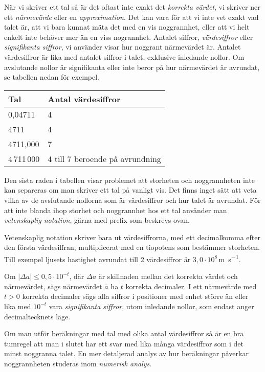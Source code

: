 När vi skriver ett tal så är det oftast inte exakt det \emph{korrekta
värdet}, vi skriver ner ett \emph{närmevärde} eller en
\emph{approximation}.  Det kan vara för att vi inte vet exakt vad
talet är, att vi bara kunnat mäta det med en vis noggrannhet, eller
att vi helt enkelt inte behöver mer än en viss nogrannhet. Antalet
siffror, \emph{värdesiffror} eller \emph{signifikanta siffror}, vi
använder visar hur noggrant närmevärdet är.  Antalet värdesiffror är
lika med antalet siffror i talet, exklusive inledande nollor.  Om
avslutande nollor är signifikanta eller inte beror på hur närmevärdet
är avrundat, se tabellen nedan för exempel.

\bigskip
\begin{centering}
\begin{tabular}{|l|l|}
\hline
Tal & Antal värdesiffror \\
\hline
0,04711 & 4\\
4711 & 4 \\
4711,000 & 7 \\
4\,711\,000 & 4 till 7 beroende på avrundning \\
\hline
\end{tabular}
\end{centering}
\bigskip

Den sista raden i tabellen visar problemet att storheten och
noggrannheten inte kan separeras om man skriver ett tal på vanligt
vis. Det finns inget sätt att veta vilka av de avslutande nollorna som
är värdesiffror och hur talet är avrundat.  För att inte blanda ihop
storhet och noggrannhet hos ett tal använder man \emph{vetenskaplig
notation}, gärna med prefix som beskrevs ovan.

Vetenskaplig notation skriver bara ut värdesiffrorna, med ett
decimalkomma efter den första värdesiffran, multiplicerat med en
tiopotens som bestämmer storheten. Till exempel ljusets hastighet
avrundat till 2 värdesiffror är $3,0 \cdot 10^8$\,\si{\metre\per\second}.

Om $|\Delta a|\leq 0,5\cdot 10^{-t}$, där $\Delta a$ är skillnaden
mellan det korrekta värdet och närmevärdet, sägs närmevärdet $\bar
{a}$ ha $t$ korrekta decimaler.
I ett närmevärde med $t>0$ korrekta decimaler sägs alla siffror i
positioner med enhet större än eller lika med $10^{-t}$ vara
\emph{signifikanta siffror}, utom inledande nollor, som endast anger
decimaltecknets läge.

Om man utför beräkningar med tal med olika antal värdesiffror så är en
bra tumregel att man i slutet har ett svar med lika många värdesiffror
som i det minst noggranna talet. En mer detaljerad analys av hur
beräkningar påverkar noggrannheten studeras inom \emph{numerisk
analys}.

